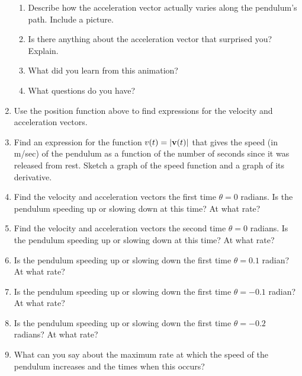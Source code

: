 \documentclass{ximera}
\begin{document}
\begin{question}
\begin{enumerate}
\begin{enumerate}
\item Describe how the acceleration vector actually varies along the pendulum's path. Include a picture.

\item Is there anything about the acceleration vector that surprised you? Explain.

\item What did you learn from this animation?

\item What questions do you have?
\end{enumerate}

\begin{freeResponse}
\end{freeResponse}

\item Use the position function above to find expressions for the velocity and acceleration vectors.

\item Find an expression for the function $v(t) = | {\bf v}(t)|$ that gives the speed (in m/sec) of the pendulum as a function of the number of seconds since it was released from rest. Sketch a graph of the speed function and a graph of its derivative. 

\item Find the velocity and acceleration vectors the first time $\theta = 0$ radians. Is the pendulum speeding up or slowing down at this time? At what rate?

\item  Find the velocity and acceleration vectors the second time $\theta = 0$ radians. Is the pendulum speeding up or slowing down at this time? At what rate?

\item Is the pendulum speeding up or slowing down the first time $\theta = 0.1$ radian? At what rate? 

\item Is the pendulum speeding up or slowing down the first time $\theta = -0.1$ radian? At what rate?

\item Is the pendulum speeding up or slowing down the first time $\theta = -0.2$ radians? At what rate? 

\item What can you say about the maximum rate at which the speed of the pendulum increases and the times when this occurs?


\end{enumerate}


\end{question}
\end{document}

